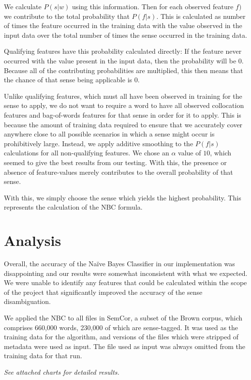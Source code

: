 \documentclass[11pt]{article}
\begin{document}
We calculate $P(s|w)$ using this information. Then for each observed feature $f)$ we contribute to the total probability that $P(f|s)$. This is calculated as number of times the feature occurred in the training data with the value observed in the input data over the total number of times the sense occurred in the training data.

Qualifying features have this probability calculated directly: If the feature never occurred with the value present in the input data, then the probability will be $0$. Because all of the contributing probabilities are multiplied, this then means that the chance of that sense being applicable is $0$.

Unlike qualifying features, which must all have been observed in training for the sense to apply, we do not want to require a word to have all observed collocation features and bag-of-words features for that sense in order for it to apply. This is because the amount of training data required to ensure that we accurately cover anywhere close to all possible scenarios in which a sense might occur is prohibitively large. Instead, we apply additive smoothing to the $P(f|s)$ calculations for all non-qualifying features. We chose an $\alpha$ value of $10$, which seemed to give the best results from our testing. With this, the presence or absence of feature-values merely contributes to the overall probability of that sense.

With this, we simply choose the sense which yields the highest probability. This represents the calculation of the NBC formula.

\section{Analysis}
Overall, the accuracy of the Na\"ive Bayes Classifier in our implementation was disappointing and our results were somewhat inconsistent with what we expected. We were unable to identify any features that could be calculated within the scope of the project that significantly improved the accuracy of the sense disambiguation.

We applied the NBC to all files in SemCor, a subset of the Brown corpus, which comprises 660,000 words, 230,000 of which are sense-tagged. It was used as the training data for the algorithm, and versions of the files which were stripped of metadata were used as input. The file used as input was always omitted from the training data for that run.

\emph{See attached charts for detailed results.}
\end{document}
